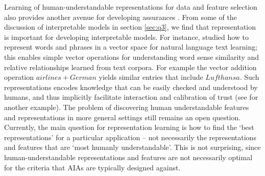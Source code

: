 Learning of human-understandable representations for data and feature selection also provides another avenue for developing assurances  \cite{Bengio2013-uv, Guyon2003-fj}. From some of the discussion of interpretable models in section \ref{sec:q3}, we find that representation is important for developing interpretable models. 
For instance, \citet{Mikolov2013-lt} studied how to represent words and phrases in a vector space for natural language text learning; this enables simple vector operations for understanding word sense similarity and relative relationships learned from text corpora. For example the vector addition operation $airlines+German$ yields similar entries that include $Lufthansa$. Such representations encodes knowledge that can be easily checked and understood by humans, and thus implicitly facilitate interaction and calibration of trust (see \cite{Haury2011-zi} for another example). 
The problem of discovering human understandable features and representations in more general settings still remains an open question. Currently, the main question for representation learning is how to find the `best representations' for a particular application -- not necessarily the representations and features that are `most humanly understandable'. This is not surprising, since human-understandable representations and features are not necessarily optimal for the criteria that AIAs are typically designed against. 

